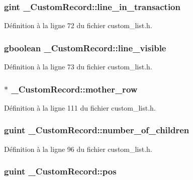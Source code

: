 \subsubsection[{line\_\-in\_\-transaction}]{\setlength{\rightskip}{0pt plus 5cm}gint {\bf \_\-CustomRecord::line\_\-in\_\-transaction}}\label{struct__CustomRecord_a8e3551cf21249d47290826d712fe0ade}


Définition à la ligne 72 du fichier custom\_\-list.h.

\subsubsection[{line\_\-visible}]{\setlength{\rightskip}{0pt plus 5cm}gboolean {\bf \_\-CustomRecord::line\_\-visible}}\label{struct__CustomRecord_a4a6cb1bab82180988050a4a4fffac318}


Définition à la ligne 73 du fichier custom\_\-list.h.

\subsubsection[{mother\_\-row}]{$\ast$ {\bf \_\-CustomRecord::mother\_\-row}}\label{struct__CustomRecord_a012f6b7a2669e2a8c3d81b40bb707555}


Définition à la ligne 111 du fichier custom\_\-list.h.

\subsubsection[{number\_\-of\_\-children}]{\setlength{\rightskip}{0pt plus 5cm}guint {\bf \_\-CustomRecord::number\_\-of\_\-children}}\label{struct__CustomRecord_a5cea8fd9bfeb5ff33fadf7f9546274ad}


Définition à la ligne 96 du fichier custom\_\-list.h.

\subsubsection[{pos}]{\setlength{\rightskip}{0pt plus 5cm}guint {\bf \_\-CustomRecord::pos}}\label{struct__CustomRecord_a9828c1e98b005c504aaa3715f92b02a8}


